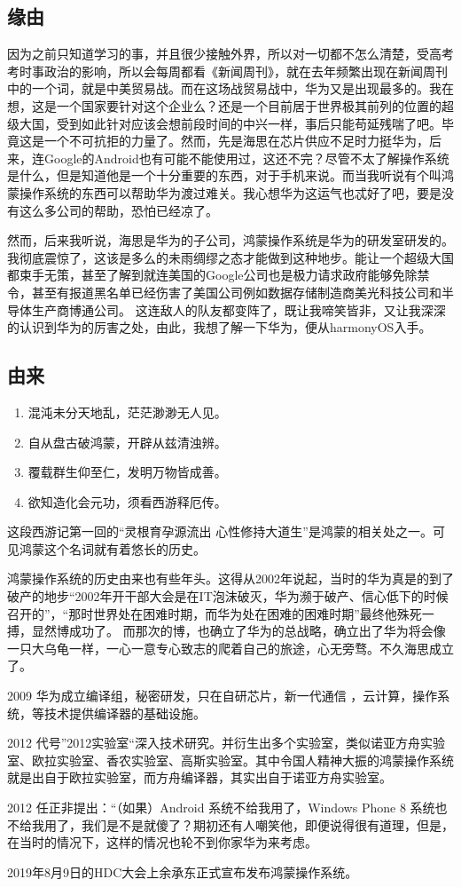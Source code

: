 \documentclass{article}
\begin{document}
\subsection{缘由}
因为之前只知道学习的事，并且很少接触外界，所以对一切都不怎么清楚，受高考考时事政治的影响，所以会每周都看《新闻周刊》，就在去年频繁出现在新闻周刊中的一个词，就是中美贸易战。而在这场战贸易战中，华为又是出现最多的。我在想，这是一个国家要针对这个企业么？还是一个目前居于世界极其前列的位置的超级大国，受到如此针对应该会想前段时间的中兴一样，事后只能苟延残喘了吧。毕竟这是一个不可抗拒的力量了。然而，先是海思在芯片供应不足时力挺华为，后来，连Google的Android也有可能不能使用过，这还不完？尽管不太了解操作系统是什么，但是知道他是一个十分重要的东西，对于手机来说。而当我听说有个叫鸿蒙操作系统的东西可以帮助华为渡过难关。我心想华为这运气也忒好了吧，要是没有这么多公司的帮助，恐怕已经凉了。\par
然而，后来我听说，海思是华为的子公司，鸿蒙操作系统是华为的研发室研发的。我彻底震惊了，这该是多么的未雨绸缪之态才能做到这种地步。能让一个超级大国都束手无策，甚至了解到就连美国的Google公司也是极力请求政府能够免除禁令，甚至有报道黑名单已经伤害了美国公司例如数据存储制造商美光科技公司和半导体生产商博通公司。 \cite{ref1}
这连敌人的队友都变阵了，既让我啼笑皆非，又让我深深的认识到华为的厉害之处，由此，我想了解一下华为，便从harmonyOS入手。\par
\newpage
\subsection{由来}
\begin{enumerate}
    \item [ ]混沌未分天地乱，茫茫渺渺无人见。
    \item [ ]自从盘古破鸿蒙，开辟从兹清浊辨。
    \item [ ]覆载群生仰至仁，发明万物皆成善。
    \item [ ]欲知造化会元功，须看西游释厄传。
\end{enumerate} \par
这段西游记第一回的“灵根育孕源流出 心性修持大道生”是鸿蒙的相关处之一。可见鸿蒙这个名词就有着悠长的历史。\par
鸿蒙操作系统的历史由来也有些年头。这得从2002年说起，当时的华为真是的到了破产的地步“2002年开干部大会是在IT泡沫破灭，华为濒于破产、信心低下的时候召开的”，“那时世界处在困难时期，而华为处在困难的困难时期”最终他殊死一搏，显然博成功了。 \cite{ref2}
而那次的博，也确立了华为的总战略，确立出了华为将会像一只大乌龟一样，一心一意专心致志的爬着自己的旅途，心无旁骛。不久海思成立了。\par 
2009 华为成立编译组，秘密研发，只在自研芯片，新一代通信 ，云计算，操作系统，等技术提供编译器的基础设施。\par
2012 代号”2012实验室“深入技术研究。并衍生出多个实验室，类似诺亚方舟实验室、欧拉实验室、香农实验室、高斯实验室。其中令国人精神大振的鸿蒙操作系统就是出自于欧拉实验室，而方舟编译器，其实出自于诺亚方舟实验室。\par
2012 任正非提出：“（如果）Android 系统不给我用了，Windows Phone 8 系统也不给我用了，我们是不是就傻了？期初还有人嘲笑他，即便说得很有道理，但是，在当时的情况下，这样的情况也轮不到你家华为来考虑。\par
2019年8月9日的HDC大会上余承东正式宣布发布鸿蒙操作系统。\par 
\end{document}
